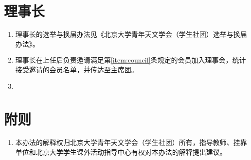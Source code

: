 \section{理事长}

\begin{enumerate}[resume]
    \item 理事长的选举与换届办法见《北京大学青年天文学会（学生社团）选举与换届办法》。
    
    \item 理事长在上任后负责邀请满足第\ref{item:council}条规定的会员加入理事会，统计接受邀请的会员名单，并传达至主席团。
    
    \item 
\end{enumerate}

\section{附则}

\begin{enumerate}[resume]
    \item 本办法的解释权归北京大学青年天文学会（学生社团）所有，指导教师、挂靠单位和北京大学学生课外活动指导中心有权对本办法的解释提出建议。
\end{enumerate}
